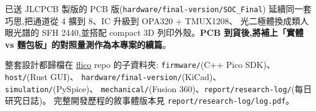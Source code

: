 \documentclass[12pt,a4paper]{article}
\begin{document}
已送 JLCPCB 製版的 PCB 版(\texttt{hardware/final-version/SOC\_Final})
延續同一套巧思,把通道從 4 擴到 8、IC 升級到 OPA320 \(+\) TMUX1208、
光二極體換成類人眼光譜的 SFH 2440,並搭配 compact 3D 列印外殼。\textbf{PCB
	到貨後,將補上「實體 vs 麵包板」的對照量測作為本專案的續篇}。

整套設計都歸檔在 \href{https://github.com/}{flico} repo 的子資料夾:
\texttt{firmware/}(C++ Pico SDK)、\texttt{host/}(Rust GUI)、
\texttt{hardware/final-version/}(KiCad)、\texttt{simulation/}(PySpice)、
\texttt{mechanical/}(Fusion 360)、\texttt{report/research-log/}(每日研究日誌)。
完整開發歷程的敘事體版本見 \texttt{report/research-log/log.pdf}。

\printbibliography
\end{document}
